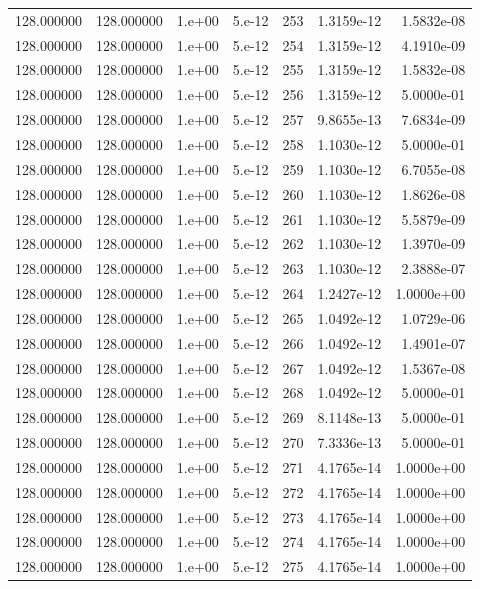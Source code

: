 \begin{table}[htbp]
\begin{tabular}{rrrrrrr}
128.000000 & 128.000000 & 1.e+00 & 5.e-12 & 253 & 1.3159e-12 & 1.5832e-08 \\
128.000000 & 128.000000 & 1.e+00 & 5.e-12 & 254 & 1.3159e-12 & 4.1910e-09 \\
128.000000 & 128.000000 & 1.e+00 & 5.e-12 & 255 & 1.3159e-12 & 1.5832e-08 \\
128.000000 & 128.000000 & 1.e+00 & 5.e-12 & 256 & 1.3159e-12 & 5.0000e-01 \\
128.000000 & 128.000000 & 1.e+00 & 5.e-12 & 257 & 9.8655e-13 & 7.6834e-09 \\
128.000000 & 128.000000 & 1.e+00 & 5.e-12 & 258 & 1.1030e-12 & 5.0000e-01 \\
128.000000 & 128.000000 & 1.e+00 & 5.e-12 & 259 & 1.1030e-12 & 6.7055e-08 \\
128.000000 & 128.000000 & 1.e+00 & 5.e-12 & 260 & 1.1030e-12 & 1.8626e-08 \\
128.000000 & 128.000000 & 1.e+00 & 5.e-12 & 261 & 1.1030e-12 & 5.5879e-09 \\
128.000000 & 128.000000 & 1.e+00 & 5.e-12 & 262 & 1.1030e-12 & 1.3970e-09 \\
128.000000 & 128.000000 & 1.e+00 & 5.e-12 & 263 & 1.1030e-12 & 2.3888e-07 \\
128.000000 & 128.000000 & 1.e+00 & 5.e-12 & 264 & 1.2427e-12 & 1.0000e+00 \\
128.000000 & 128.000000 & 1.e+00 & 5.e-12 & 265 & 1.0492e-12 & 1.0729e-06 \\
128.000000 & 128.000000 & 1.e+00 & 5.e-12 & 266 & 1.0492e-12 & 1.4901e-07 \\
128.000000 & 128.000000 & 1.e+00 & 5.e-12 & 267 & 1.0492e-12 & 1.5367e-08 \\
128.000000 & 128.000000 & 1.e+00 & 5.e-12 & 268 & 1.0492e-12 & 5.0000e-01 \\
128.000000 & 128.000000 & 1.e+00 & 5.e-12 & 269 & 8.1148e-13 & 5.0000e-01 \\
128.000000 & 128.000000 & 1.e+00 & 5.e-12 & 270 & 7.3336e-13 & 5.0000e-01 \\
128.000000 & 128.000000 & 1.e+00 & 5.e-12 & 271 & 4.1765e-14 & 1.0000e+00 \\
128.000000 & 128.000000 & 1.e+00 & 5.e-12 & 272 & 4.1765e-14 & 1.0000e+00 \\
128.000000 & 128.000000 & 1.e+00 & 5.e-12 & 273 & 4.1765e-14 & 1.0000e+00 \\
128.000000 & 128.000000 & 1.e+00 & 5.e-12 & 274 & 4.1765e-14 & 1.0000e+00 \\
128.000000 & 128.000000 & 1.e+00 & 5.e-12 & 275 & 4.1765e-14 & 1.0000e+00 \\

\end{tabular}
\end{table}
